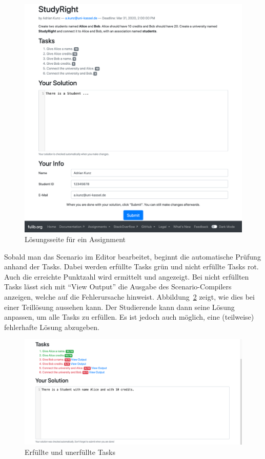 \begin{figure}
    \centering
    \includegraphics[width=\textwidth]{chapter/fulib.org/img/assignment-solve.png}
    \caption{Lösungsseite für ein Assignment}
    \label{fig:assignment-solve}
\end{figure}

Sobald man das Scenario im Editor bearbeitet, beginnt die automatische Prüfung anhand der Tasks.
Dabei werden erfüllte Tasks grün und nicht erfüllte Tasks rot.
Auch die erreichte Punktzahl wird ermittelt und angezeigt.
Bei nicht erfüllten Tasks lässt sich mit ``View Output'' die Ausgabe des Scenario-Compilers anzeigen, welche auf die Fehlerursache hinweist.
Abbildung~\ref{fig:solve-tasks} zeigt, wie dies bei einer Teillösung aussehen kann.
Der Studierende kann dann seine Lösung anpassen, um alle Tasks zu erfüllen.
Es ist jedoch auch möglich, eine (teilweise) fehlerhafte Lösung abzugeben.

\begin{figure}
    \centering
    \includegraphics[width=\textwidth]{chapter/fulib.org/img/solve-tasks.png}
    \caption{Erfüllte und unerfüllte Tasks}
    \label{fig:solve-tasks}
\end{figure}

